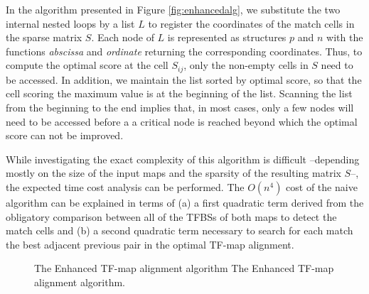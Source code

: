 In the algorithm presented in Figure \ref{fig:enhancedalg}, we substitute the two internal nested 
loops by a list $L$ to register the coordinates of the match cells in the sparse matrix $S$. 
Each node of $L$ is represented as structures $p$ and $n$ with the functions
\emph{abscissa} and \emph{ordinate} returning the corresponding coordinates.
Thus, to compute the optimal score at the cell $S_{ij}$, only the non-empty cells 
in $S$ need to be accessed. In addition, we maintain the list sorted 
by optimal score, so that the cell scoring the maximum value is at the beginning of 
the list. Scanning the list from the beginning to the end implies that, in most cases, 
only a few nodes will need to be accessed before a a critical node is reached 
beyond which the optimal score can not be improved.

While investigating the exact complexity of this algorithm is
difficult --depending mostly on the size of the input maps and the
sparsity of the resulting matrix $S$--, the expected time cost analysis
can be performed. The $O(n^4)$ cost of the naive algorithm can be
explained in terms of (a) a first quadratic term derived from the
obligatory comparison between all of the TFBSs of both maps to detect
the match cells and (b) a second quadratic term necessary to search
for each match the best adjacent previous pair in the optimal TF-map
alignment.

\begin{figure}[t!]
\begin{center}
          {The Enhanced TF-map alignment algorithm}%
          {The Enhanced TF-map alignment algorithm.}%
          {}
\end{center}
\end{figure}

